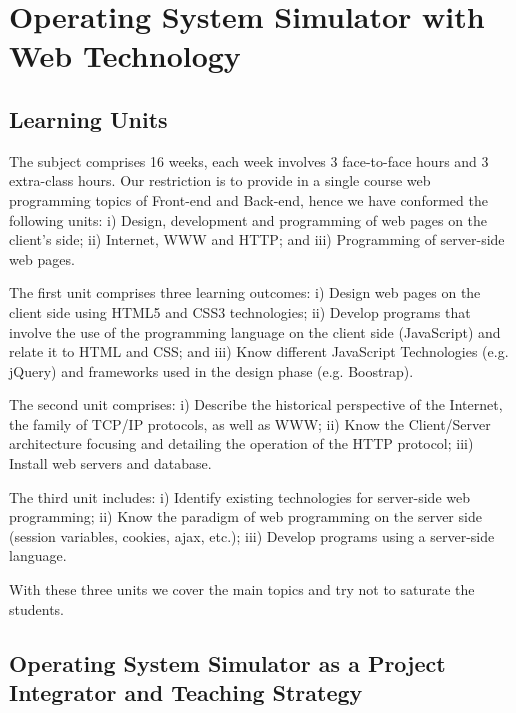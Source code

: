 \section{Operating System Simulator with Web Technology}
\label{sec:GralExplanation}

\subsection{Learning Units}
\label{ssec:learningUnits}
The subject comprises 16 weeks, each week involves 3 face-to-face hours and 
3 extra-class hours. Our restriction is to provide in a single course web 
programming topics of Front-end and Back-end, hence we have conformed the 
following units: 
i) Design, development and programming of web pages on the client's side; 
ii) Internet, WWW and HTTP; and 
iii) Programming of server-side web pages.

The first unit comprises three learning outcomes: 
i) Design web pages on the client side using HTML5 and CSS3 technologies;
ii) Develop programs that involve the use of the programming language on the 
client side (JavaScript) and relate it to HTML and CSS; and 
iii) Know different JavaScript Technologies (e.g. jQuery) and frameworks used 
in the design phase (e.g. Boostrap).

The second unit comprises: 
i) Describe the historical perspective of the Internet, the family of 
TCP/IP protocols, as well as WWW; 
ii) Know the Client/Server architecture focusing and detailing the operation 
of the HTTP protocol; 
iii) Install web servers and database.

The third unit includes: 
i) Identify existing technologies for server-side web programming; 
ii) Know the paradigm of web programming on the server side (session variables, 
cookies, ajax, etc.); 
iii) Develop programs using a server-side language.

With these three units we cover the main topics and try not to saturate the students.

\subsection{Operating System Simulator as a Project Integrator and Teaching Strategy}
\label{ssec:projectIntegrator}


